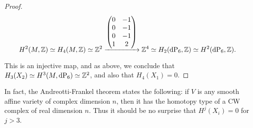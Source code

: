 \begin{proof}
\[
H^2(M,\Z) \simeq H_4(M,\Z) \simeq \Z^2 \xrightarrow{
	\begin{pmatrix}
	0 & -1 \\
	0 & -1 \\
	0 & -1  \\
	1 & 2 
	\end{pmatrix}
} \Z^4 \simeq H_2(\dP6,\Z) \simeq H^2(\dP6,\Z).
\]

This is an injective map, and as above, we conclude that $H_3(X_2) \simeq H^3(M,\dP6) \simeq \Z^2$, and also that $H_4(X_1)=0$.
\end{proof}

\begin{remark}
In fact, the Andreotti-Frankel theorem \cite{andreotti_affinecw} states the following: if $V$ is any smooth affine variety of complex dimension $n$, then it has the homotopy type of a CW complex of real dimension $n$. Thus it should be no surprise that $H^j(X_i)=0$ for $j > 3$.
\end{remark}
 